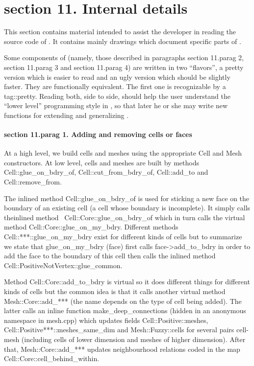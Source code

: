 \section{\numb section 11. Internal details}

This section contains material intended to assist the developer in reading the source code
of \maniFEM.
It contains mainly drawings which document specific parts of \maniFEM.

Some components of {\maniFEM} (namely, those described in paragraphs \numb section 11.\numb parag 2,
\numb section 11.\numb parag 3 and \numb section 11.\numb parag 4) are written in two ``flavors'',
a pretty version which is easier
to read and an ugly version which should be slightly faster.
They are functionally equivalent.
The first one is recognizable by a {\codett tag::pretty}.
Reading both, side to side, should help the user understand the ``lower level'' programming style
in {\maniFEM}, so that later he or she may write new functions for extending and generalizing
{\maniFEM}.


\paragraph{\numb section 11.\numb parag 1. Adding and removing cells or faces}

At a high level, we build cells and meshes using the appropriate {\codett Cell} and
{\codett Mesh} constructors.
At low level, cells and meshes are built by methods
{\codett Cell::glue\_on\_bdry\_of},
{\codett Cell::cut\_from\_bdry\_of}, {\codett Cell::add\_to} and {\codett Cell::remove\_from}.

The inlined method {\codett Cell::glue\_on\_bdry\_of} is used for sticking a new face on the
boundary of an existing cell (a cell whose boundary is incomplete).
It simply calls the\break inlined method \ {\codett Cell::Core::glue\_on\_bdry\_of}
which in turn calls the virtual method\break
{\codett Cell::Core::glue\_on\_my\_bdry}.
Different methods {\codett Cell::***::glue\_on\_my\_bdry} exist for different kinds of cells
but to summarize we state that {\codett glue\_on\_my\_bdry (face)} first calls
{\codett face->add\_to\_bdry} in order to add the face to the boundary of {\codett this} cell
then calls the inlined method {\codett Cell::PositiveNotVertex::glue\_common}.

Method {\codett Cell::Core::add\_to\_bdry} is virtual so it does different things for
different kinds of cells but the common idea is that it calls another virtual method\break
{\codett Mesh::Core::add\_***} (the name depends on the type of cell being added).
The latter calls an inline function {\codett make\_deep\_connections} (hidden in an anonymous
namespace in {\codett mesh.cpp}) which updates fields
{\codett Cell::Positive::meshes}, {\codett Cell::Positive***::meshes\_same\_dim} and
{\codett Mesh::Fuzzy::cells} for several pairs cell-mesh
(including cells of lower dimension and meshes of higher dimension).
After that, {\codett Mesh::Core::add\_***} updates neighbourhood relations coded in the map
{\codett Cell::Core::cell\_behind\_within}.

